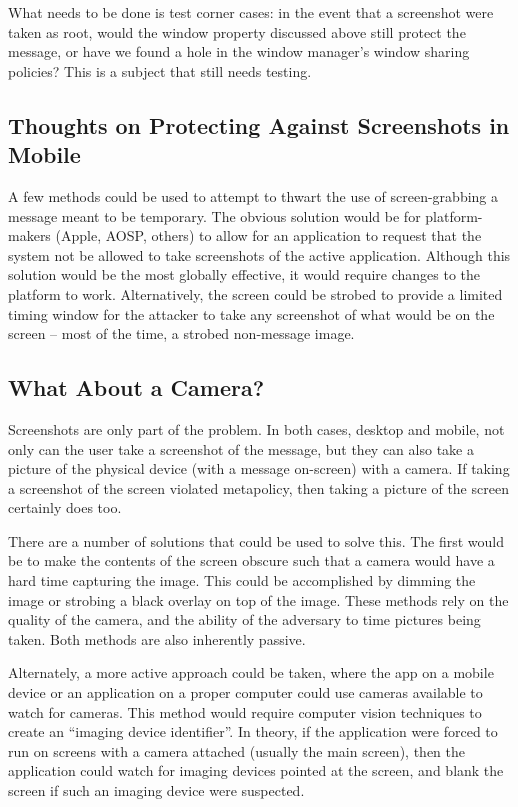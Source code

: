 \documentclass[11pt, a4paper,titlepage]{report}
\begin{document}
What needs to be done is test corner cases: in the event that a screenshot were taken as root, would the window property discussed above still protect the message, or have we found a hole in the window manager's window sharing policies? This is a subject that still needs testing. 

\subsection*{Thoughts on Protecting Against Screenshots in Mobile} 
A few methods could be used to attempt to thwart the use of screen-grabbing a message meant to be temporary. The obvious solution would be for platform-makers (Apple, AOSP, others) to allow for an application to request that the system not be allowed to take screenshots of the active application. Although this solution would be the most globally effective, it would require changes to the platform to work. Alternatively, the screen could be strobed to provide a limited timing window for the attacker to take any screenshot of what would be on the screen -- most of the time, a strobed non-message image.

\subsection*{What About a Camera?}

Screenshots are only part of the problem. In both cases, desktop and mobile, not only can the user take a screenshot of the message, but they can also take a picture of the physical device (with a message on-screen) with a camera. If taking a screenshot of the screen violated metapolicy, then taking a picture of the screen certainly does too. 

There are a number of solutions that could be used to solve this. The first would be to make the contents of the screen obscure such that a camera would have a hard time capturing the image. This could be accomplished by dimming the image or strobing a black overlay on top of the image. These methods rely on the quality of the camera, and the ability of the adversary to time pictures being taken. Both methods are also inherently passive.

Alternately, a more active approach could be taken, where the app on a mobile device or an application on a proper computer could use cameras available to watch for cameras. This method would require computer vision techniques to create an ``imaging device identifier''. In theory, if the application were forced to run on screens with a camera attached (usually the main screen), then the application could watch for imaging devices pointed at the screen, and blank the screen if such an imaging device were suspected. 
\end{document}

